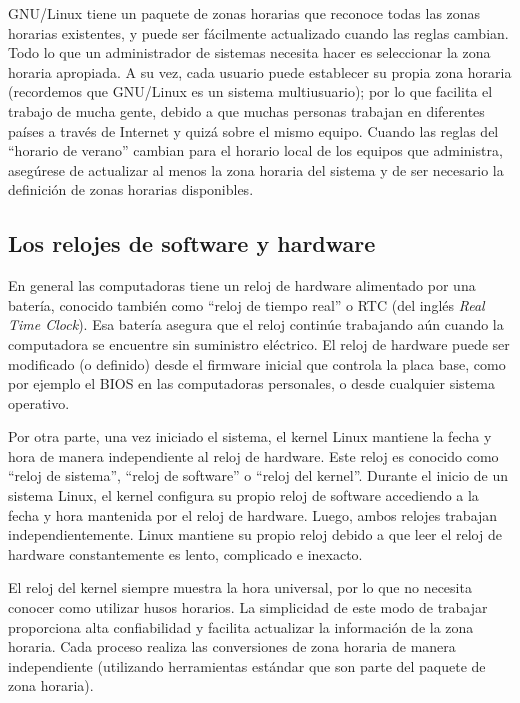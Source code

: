 \documentclass[12pt]{article}
\begin{document}
GNU/Linux tiene un paquete de zonas horarias que reconoce todas las zonas horarias existentes,
y puede ser fácilmente actualizado cuando las reglas cambian. Todo lo que un administrador de 
sistemas necesita hacer es seleccionar la zona horaria apropiada. A su vez, cada usuario 
puede establecer su propia zona horaria (recordemos que GNU/Linux es un sistema multiusuario); 
por lo que facilita el trabajo de mucha gente, debido a que muchas personas trabajan en diferentes 
países a través de Internet y quizá sobre el mismo equipo.
Cuando las reglas del ``horario de verano'' cambian para el horario local de los equipos que 
administra, asegúrese de actualizar al menos la zona horaria del sistema y de ser necesario 
la definición de zonas horarias disponibles. 


\subsection*{ Los relojes de software y hardware}


En general las computadoras tiene un reloj de hardware alimentado por una batería, conocido también como 
``reloj de tiempo real'' o RTC (del inglés \textit{Real Time Clock}). 
Esa batería asegura que el reloj continúe trabajando aún cuando la computadora se encuentre sin
suministro eléctrico. El reloj de hardware puede ser modificado (o definido)
desde el firmware inicial que controla la placa base, como por ejemplo el BIOS en las 
computadoras personales, o desde cualquier sistema operativo.

Por otra parte, una vez iniciado el sistema, el kernel Linux mantiene la fecha y hora 
de manera independiente al reloj de hardware. Este reloj es conocido como ``reloj de sistema'', 
``reloj de software'' o ``reloj del kernel''. 
Durante el inicio de un sistema Linux, el kernel configura su propio reloj de software accediendo
a la fecha y hora mantenida por el reloj de hardware.
Luego, ambos relojes trabajan independientemente.
Linux mantiene su propio reloj debido a que leer el reloj de hardware constantemente es 
lento, complicado e inexacto.

El reloj del kernel siempre muestra la hora universal, por lo que
no necesita conocer como utilizar husos horarios. La simplicidad de este
modo de trabajar proporciona alta confiabilidad y facilita actualizar 
la información de la zona horaria. Cada proceso realiza las conversiones de zona horaria 
de manera independiente (utilizando herramientas estándar que son parte del paquete de zona horaria).
\end{document}
